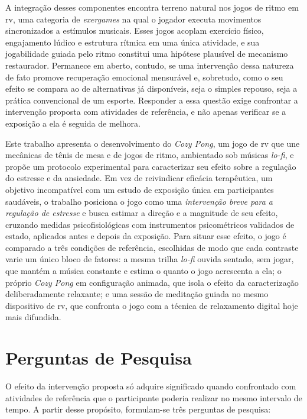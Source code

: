 A integração desses componentes encontra terreno natural nos jogos de ritmo em \gls{rv}, uma categoria de \textit{exergames} na qual o jogador executa movimentos sincronizados a estímulos musicais. Esses jogos acoplam exercício físico, engajamento lúdico e estrutura rítmica em uma única atividade, e sua jogabilidade guiada pelo ritmo constitui uma hipótese plausível de mecanismo restaurador. Permanece em aberto, contudo, se uma intervenção dessa natureza de fato promove recuperação emocional mensurável e, sobretudo, como o seu efeito se compara ao de alternativas já disponíveis, seja o simples repouso, seja a prática convencional de um esporte. Responder a essa questão exige confrontar a intervenção proposta com atividades de referência, e não apenas verificar se a exposição a ela é seguida de melhora.

Este trabalho apresenta o desenvolvimento do \textit{Cozy Pong}, um jogo de \gls{rv} que une mecânicas de tênis de mesa e de jogos de ritmo, ambientado sob músicas \textit{lo-fi}, e propõe um protocolo experimental para caracterizar seu efeito sobre a regulação do estresse e da ansiedade. Em vez de reivindicar eficácia terapêutica, um objetivo incompatível com um estudo de exposição única em participantes saudáveis, o trabalho posiciona o jogo como uma \emph{intervenção breve para a regulação de estresse} e busca estimar a direção e a magnitude de seu efeito, cruzando medidas psicofisiológicas com instrumentos psicométricos validados de estado, aplicados antes e depois da exposição. Para situar esse efeito, o jogo é comparado a três condições de referência, escolhidas de modo que cada contraste varie um único bloco de fatores: a mesma trilha \textit{lo-fi} ouvida sentado, sem jogar, que mantém a música constante e estima o quanto o jogo acrescenta a ela; o próprio \textit{Cozy Pong} em configuração animada, que isola o efeito da caracterização deliberadamente relaxante; e uma sessão de meditação guiada no mesmo dispositivo de \gls{rv}, que confronta o jogo com a técnica de relaxamento digital hoje mais difundida.

\section{Perguntas de Pesquisa}\label{sec:problemas}

O efeito da intervenção proposta só adquire significado quando confrontado com atividades de referência que o participante poderia realizar no mesmo intervalo de tempo. A partir desse propósito, formulam-se três perguntas de pesquisa:

